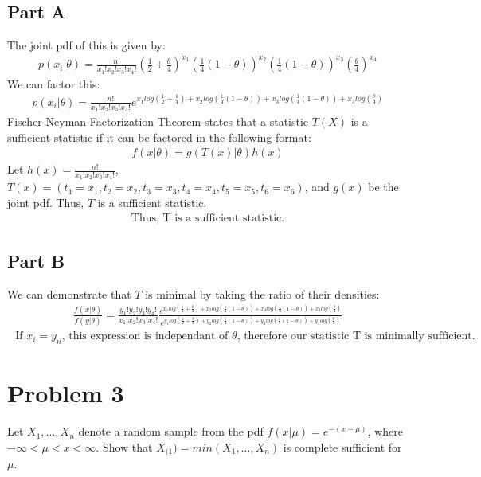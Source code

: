 \documentclass{article}
\begin{document}
\subsection*{Part A}
The joint pdf of this is given by:
\begin{align*}
p(x_i|\theta) = \frac{n!}{x_1! x_2! x_3! x_4!} (\frac{1}{2}+\frac{\theta}{4})^{x_1} (\frac{1}{4}(1-\theta))^{x_2} (\frac{1}{4}(1-\theta))^{x_3} (\frac{\theta}{4})^{x_4}
\end{align*}
We can factor this:
\begin{align*}
p(x_i|\theta) = \frac{n!}{x_1! x_2! x_3! x_4!} e^{x_1 log(\frac{1}{2}+\frac{\theta}{4}) + x_2 log(\frac{1}{4}(1-\theta))+x_3 log(\frac{1}{4}(1-\theta)) + x_4 log(\frac{\theta}{4}) }
\end{align*}
Fischer-Neyman Factorization Theorem states that a statistic $T(X)$ is a sufficient statistic if it can be factored in the following format:
\begin{align*}
f(x|\theta) = g(T(x)|\theta)h(x)
\end{align*}
Let $h(x)=\frac{n!}{x_1! x_2! x_3! x_4!}$, $T(x)=(t_1=x_1,t_2=x_2,t_3=x_3,t_4=x_4,t_5=x_5,t_6=x_6)$, and $g(x)$ be the joint pdf. Thus, $T$ is a sufficient statistic.
\begin{align*}
\boxed{ \text{Thus, T is a sufficient statistic.} }
\end{align*}
\subsection*{Part B}
We can demonstrate that $T$ is minimal by taking the ratio of their densities:
\begin{align*}
\frac{f(x|\theta)}{f(y|\theta)} = \frac{y_1! y_2! y_3! y_4!}{x_1! x_2! x_3! x_4!} \frac{e^{x_1 log(\frac{1}{2}+\frac{\theta}{4}) + x_2 log(\frac{1}{4}(1-\theta))+x_3 log(\frac{1}{4}(1-\theta)) + x_4 log(\frac{\theta}{4})}}{e^{y_1 log(\frac{1}{2}+\frac{\theta}{4}) + y_2 log(\frac{1}{4}(1-\theta))+y_3 log(\frac{1}{4}(1-\theta)) + y_4 log(\frac{\theta}{4})}}
\end{align*}
\begin{align*}
\boxed{ \text{ If }x_i=y_n\text{, this expression is independant of }\theta\text{, therefore our statistic T is minimally sufficient.} }
\end{align*}
\clearpage

\section*{Problem 3}
Let $X_1,...,X_n$ denote a random sample from the pdf $f(x|\mu) = e^{-(x-\mu)}$, where $-\infty < \mu < x < \infty$. Show that $X_{(1}) = min(X_1,..., X_n)$ is complete sufficient for $\mu$.
\end{document}
